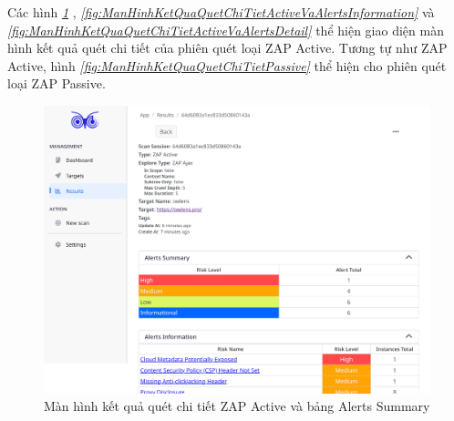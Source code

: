 Các hình \textit{\ref{fig:ManHinhKetQuaQuetChiTietActiveVaAlertsSummary} }
, \textit{\ref{fig:ManHinhKetQuaQuetChiTietActiveVaAlertsInformation} } 
và \textit{\ref{fig:ManHinhKetQuaQuetChiTietActiveVaAlertsDetail} } 
thể hiện giao diện màn hình kết quả quét chi tiết của phiên quét loại ZAP Active.
Tương tự như ZAP Active, hình \textit{\ref{fig:ManHinhKetQuaQuetChiTietPassive} } 
thể hiện cho phiên quét loại ZAP Passive.

\begin{figure}[H]
      \centering
      \includegraphics[width=\textwidth]{applied-thesis-chapters/chapter-6/Màn hình kết quả quét chi tiết ZAP Active và bảng Alerts Summary.png}
      \caption{Màn hình kết quả quét chi tiết ZAP Active và bảng Alerts Summary}
      \label{fig:ManHinhKetQuaQuetChiTietActiveVaAlertsSummary}
\end{figure}

